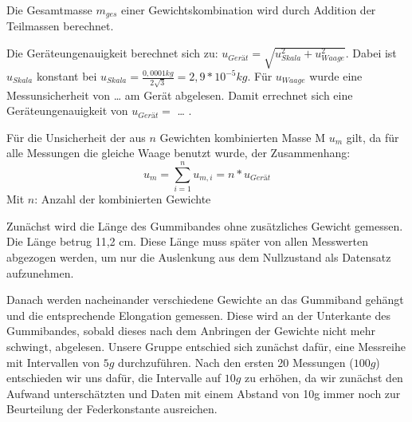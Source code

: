 \documentclass[
  9pt,
]{article}
\newenvironment{Shaded}{\begin{snugshade}}{\end{snugshade}}
\newcommand{\CommentTok}[1]{\textcolor[rgb]{0.56,0.35,0.01}{\textit{#1}}}
\newcommand{\DecValTok}[1]{\textcolor[rgb]{0.00,0.00,0.81}{#1}}
\newcommand{\FloatTok}[1]{\textcolor[rgb]{0.00,0.00,0.81}{#1}}
\newcommand{\FunctionTok}[1]{\textcolor[rgb]{0.00,0.00,0.00}{#1}}
\newcommand{\NormalTok}[1]{#1}
\newcommand{\OtherTok}[1]{\textcolor[rgb]{0.56,0.35,0.01}{#1}}
\newcommand{\SpecialCharTok}[1]{\textcolor[rgb]{0.00,0.00,0.00}{#1}}
\begin{document}
Die Gesamtmasse \(m_{ges}\) einer Gewichtskombination wird durch
Addition der Teilmassen berechnet.

Die Geräteungenauigkeit berechnet sich zu:
\(u_{Gerät}= \sqrt{u_{Skala}^2+u_{Waage}^2}\). Dabei ist \(u_{Skala}\)
konstant bei \(u_{Skala} = \frac{0,0001kg}{2\sqrt{3}}=2,9*10^{-5}kg\).
Für \(u_{Waage}\) wurde eine Messunsicherheit von \ldots{} am Gerät
abgelesen. Damit errechnet sich eine Geräteungenauigkeit von
\(u_{Gerät}=\) \ldots{} .

Für die Unsicherheit der aus \(n\) Gewichten kombinierten Masse M
\(u_{m}\) gilt, da für alle Messungen die gleiche Waage benutzt wurde,
der Zusammenhang: \[u_m = \sum\limits_{i=1}^{n}u_{m,i} = n*u_{Gerät}\]
Mit \(n\): Anzahl der kombinierten Gewichte

\begin{Shaded}
\end{Shaded}

Zunächst wird die Länge des Gummibandes ohne zusätzliches Gewicht
gemessen. Die Länge betrug 11,2 cm. Diese Länge muss später von allen
Messwerten abgezogen werden, um nur die Auslenkung aus dem Nullzustand
als Datensatz aufzunehmen.

Danach werden nacheinander verschiedene Gewichte an das Gummiband
gehängt und die entsprechende Elongation gemessen. Diese wird an der
Unterkante des Gummibandes, sobald dieses nach dem Anbringen der
Gewichte nicht mehr schwingt, abgelesen. Unsere Gruppe entschied sich
zunächst dafür, eine Messreihe mit Intervallen von \(5g\) durchzuführen.
Nach den ersten 20 Messungen (\(100g\)) entschieden wir uns dafür, die
Intervalle auf \(10g\) zu erhöhen, da wir zunächst den Aufwand
unterschätzten und Daten mit einem Abstand von 10g immer noch zur
Beurteilung der Federkonstante ausreichen.
\end{document}
